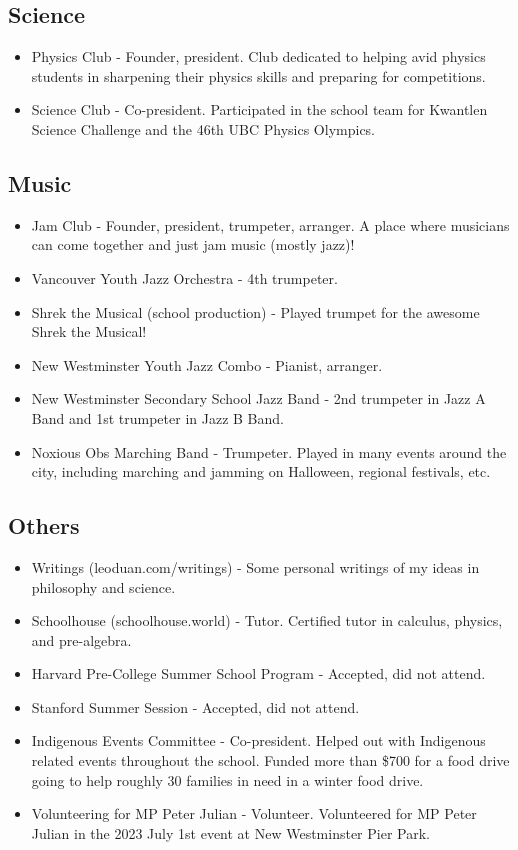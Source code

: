 \documentclass{article}
\begin{document}
\subsection*{Science}%

\begin{itemize}
\item Physics Club - Founder, president. Club dedicated to helping avid physics students in sharpening their physics skills and preparing for competitions.
\item Science Club - Co-president. Participated in the school team for Kwantlen Science Challenge and the 46th UBC Physics Olympics.
\end{itemize}

\subsection*{Music}%

\begin{itemize}
\item Jam Club - Founder, president, trumpeter, arranger. A place where musicians can come together and just jam music (mostly jazz)!
\item Vancouver Youth Jazz Orchestra - 4th trumpeter.
\item Shrek the Musical (school production) - Played trumpet for the awesome Shrek the Musical!
\item New Westminster Youth Jazz Combo - Pianist, arranger.
\item New Westminster Secondary School Jazz Band - 2nd trumpeter in Jazz A Band and 1st trumpeter in Jazz B Band.
\item Noxious Obs Marching Band - Trumpeter. Played in many events around the city, including marching and jamming on Halloween, regional festivals, etc.
\end{itemize}

\subsection*{Others}%
\begin{itemize}
\item Writings (leoduan.com/writings) - Some personal writings of my ideas in philosophy and science.
\item Schoolhouse (schoolhouse.world) - Tutor. Certified tutor in calculus, physics, and pre-algebra.
\item Harvard Pre-College Summer School Program - Accepted, did not attend.
\item Stanford Summer Session - Accepted, did not attend.
\item Indigenous Events Committee - Co-president. Helped out with Indigenous related events throughout the school. Funded more than \$700 for a food drive going to help roughly 30 families in need in a winter food drive.
\item Volunteering for MP Peter Julian - Volunteer. Volunteered for MP Peter Julian in the 2023 July 1st event at New Westminster Pier Park.
\end{itemize}
\end{document}
